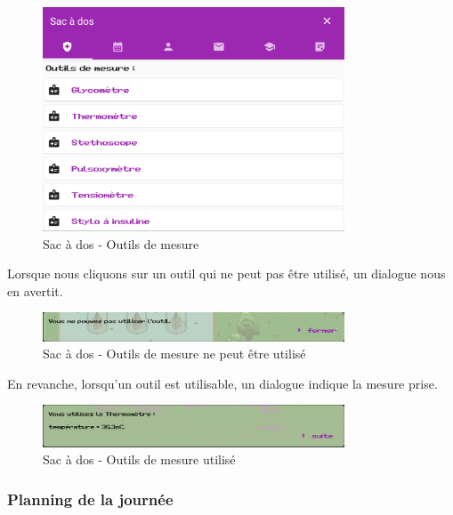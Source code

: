 \begin{figure}[H]
    \centering
    \includegraphics[width=0.8\textwidth ]{images/toolsMenu/tools.png}
    \caption{Sac à dos - Outils de mesure}
    \label{fig:pic_dessus}
\end{figure}

Lorsque nous cliquons sur un outil qui ne peut pas être utilisé, un dialogue nous en avertit.

\begin{figure}[H]
    \centering
    \includegraphics[width=0.8\textwidth ]{images/toolsMenu/toolCantBeUsed.png}
    \caption{Sac à dos - Outils de mesure ne peut être utilisé}
    \label{fig:pic_dessus}
\end{figure}

En revanche, lorsqu'un outil est utilisable, un dialogue indique la mesure prise.
\begin{figure}[H]
    \centering
    \includegraphics[width=0.8\textwidth ]{images/toolsMenu/toolCanBeUsed.png}
    \caption{Sac à dos - Outils de mesure utilisé}
    \label{fig:pic_dessus}
\end{figure}


\subsubsection*{Planning de la journée}

